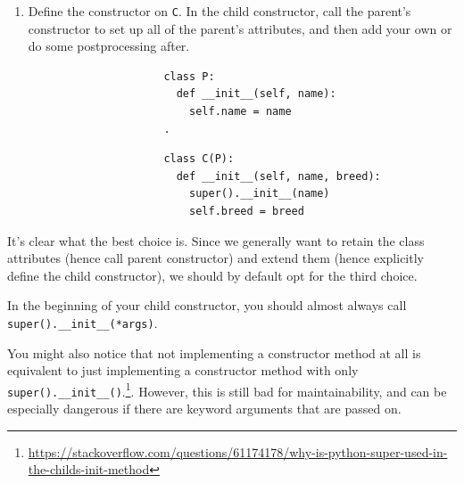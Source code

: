 \begin{enumerate}
    \item Define the constructor on \texttt{C}. In the child constructor, call the parent's constructor to set up all of the parent's attributes, and then add your own or do some postprocessing after. 

    \begin{figure}[H]
      \centering
      \begin{subfigure}[b]{0.48\textwidth}
        \centering
        \begin{lstlisting}
          class P: 
            def __init__(self, name): 
              self.name = name
          .
        \end{lstlisting}
        \caption{}
      \end{subfigure}
      \hfill 
      \begin{subfigure}[b]{0.48\textwidth}
        \centering
        \begin{lstlisting}
          class C(P): 
            def __init__(self, name, breed): 
              super().__init__(name)
              self.breed = breed
        \end{lstlisting}
        \caption{}
      \end{subfigure}
      \caption{}
    \end{figure}
  \end{enumerate}

  It's clear what the best choice is. Since we generally want to retain the class attributes (hence call parent constructor) and extend them (hence explicitly define the child constructor), we should by default opt for the third choice. 

  \begin{theorem}[Heuristic]
    \label{thm:heuristic}
    In the beginning of your child constructor, you should almost always call \texttt{super().\_\_init\_\_(*args)}. 
  \end{theorem} 

  You might also notice that not implementing a constructor method at all is equivalent to just implementing a constructor method with only \texttt{super().\_\_init\_\_()}.\footnote{\href{https://stackoverflow.com/questions/61174178/why-is-python-super-used-in-the-childs-init-method}{https://stackoverflow.com/questions/61174178/why-is-python-super-used-in-the-childs-init-method}}. However, this is still bad for maintainability, and can be especially dangerous if there are keyword arguments that are passed on. 

